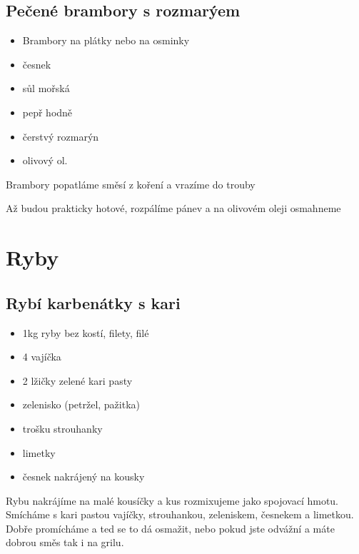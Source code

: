 \documentclass[10pt,a4paper]{article}
\newenvironment{myitemize}
{ \begin{itemize}
    \setlength{\itemsep}{0pt}
    \setlength{\parskip}{0pt}
    \setlength{\parsep}{0pt}     }
{ \end{itemize}                  }
\begin{document}
\subsection{Pečené brambory s rozmarýem}
\begin{minipage}[t]{0,5\textwidth}
\begin{myitemize} 
\item Brambory na plátky nebo na osminky
\item česnek 
\item sůl mořská
\item pepř hodně 
\item čerstvý rozmarýn
\item olivový ol.
\end{myitemize}
\end{minipage}
\begin{minipage}[t]{0,5\textwidth}
Brambory popatláme směsí z koření a vrazíme do trouby

Až budou prakticky hotové, rozpálíme pánev a na olivovém oleji osmahneme
\end{minipage}
\pagebreak
\section{Ryby}

\subsection{Rybí karbenátky s kari}
\begin{minipage}[t]{0,5\textwidth}
\begin{myitemize} 
\item 1kg ryby bez kostí, filety, filé
\item 4 vajíčka
\item 2 lžičky zelené kari pasty
\item zelenisko (petržel, pažitka)
\item trošku strouhanky
\item limetky
\item česnek nakrájený na kousky
\end{myitemize}
\end{minipage}
\begin{minipage}[t]{0,5\textwidth}
Rybu nakrájíme na malé kousíčky a kus rozmixujeme jako spojovací hmotu. Smícháme s kari pastou vajíčky, strouhankou, zeleniskem, česnekem a limetkou. Dobře promícháme a ted se to dá osmažit, nebo pokud jste odvážní a máte dobrou směs tak i na grilu.
\end{minipage}
\pagebreak
\end{document}
